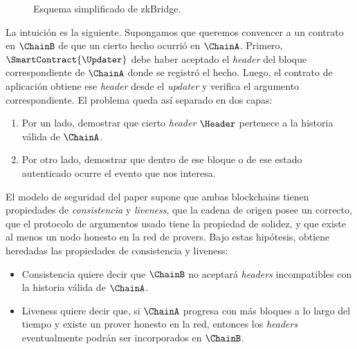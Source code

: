 \begin{figure}[ht]
		\caption{Esquema simplificado de zkBridge.}
	\label{fig:zkbridge-simplified}
\end{figure}

La intuición es la siguiente. Supongamos que queremos convencer a un contrato en $\ChainB$ de que un cierto hecho ocurrió en $\ChainA$. Primero, $\SmartContract{\Updater}$ debe haber aceptado el \textit{header} del bloque correspondiente de $\ChainA$ donde se registró el hecho. Luego, el contrato de aplicación obtiene ese \textit{header} desde el \textit{updater} y verifica el argumento \ZK correspondiente. El problema queda así separado en dos capas:
\begin{enumerate}[noitemsep]
		\item Por un lado, demostrar que cierto \textit{header} $\Header$ pertenece a la historia válida de $\ChainA$.
	\item Por otro lado, demostrar que dentro de ese bloque o de ese estado autenticado ocurre el evento que nos interesa.
\end{enumerate}

El modelo de seguridad del paper supone que ambas blockchains tienen propiedades de \emph{consistencia} y \emph{liveness}, que la cadena de origen posee un \LightClientProtocol correcto, que el protocolo de argumentos \ZK usado tiene la propiedad de solidez, y que existe al menos un nodo honesto en la red de provers. Bajo estas hipótesis, \zkBridge obtiene heredadas las propiedades de consistencia y liveness:
\begin{itemize}[noitemsep]
	\item Consistencia quiere decir que $\ChainB$ no aceptará \textit{headers} incompatibles con la historia válida de $\ChainA$.
	\item Liveness quiere decir que, si $\ChainA$ progresa con más bloques a lo largo del tiempo y existe un prover honesto en la red, entonces los \textit{headers} eventualmente podrán ser incorporados en $\ChainB$.
\end{itemize}

